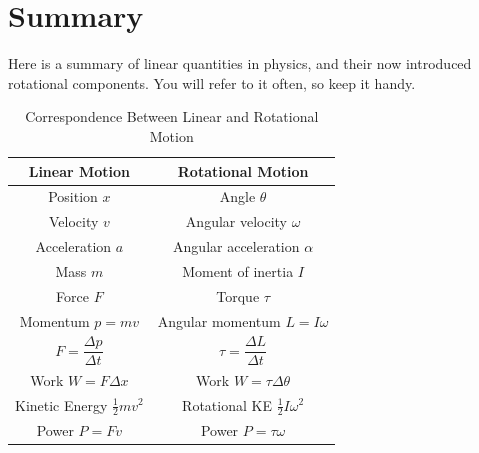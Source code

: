 \section{Summary}
Here is a summary of linear quantities in physics, and their now introduced rotational components. You will refer to it often, so keep it handy.
\begin{table}[H]
\centering
\renewcommand{\arraystretch}{1.5}
\caption{Correspondence Between Linear and Rotational Motion}
\label{tab:linear_rotational_analogy}
\begin{tabular}{|c|c|}
\hline
\textbf{Linear Motion} & \textbf{Rotational Motion} \\
\hline
Position $x$ & Angle $\theta$ \\
\hline
Velocity $v$ & Angular velocity $\omega$ \\
\hline
Acceleration $a$ & Angular acceleration $\alpha$ \\
\hline
Mass $m$ & Moment of inertia $I$ \\
\hline
Force $F$ & Torque $\tau$ \\
\hline
Momentum $p = mv$ & Angular momentum $L = I\omega$ \\
\hline
$F = \dfrac{\Delta p}{\Delta t}$ & $\tau = \dfrac{\Delta L}{\Delta t}$ \\
\hline
Work $W = F \Delta x$ & Work $W = \tau \Delta \theta$ \\
\hline
Kinetic Energy $\tfrac{1}{2}mv^2$ & Rotational KE $\tfrac{1}{2}I\omega^2$ \\
\hline
Power $P = Fv$ & Power $P = \tau \omega$ \\
\hline
\end{tabular}
\end{table}
